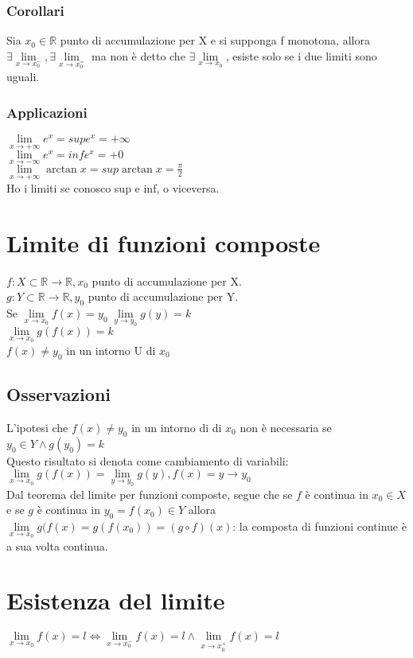\subsubsection{Corollari}
Sia $x_0\in\mathbb{R}$ punto di accumulazione per X e si supponga f monotona, allora $\exists\lim\limits_{x\rightarrow x_0^-}, \exists\lim\limits_{x\rightarrow x_0^=}$ ma non \`e detto che  $\exists\lim\limits_{x\rightarrow x_0}$, esiste solo se i due limiti sono uguali.
\subsubsection{Applicazioni}
$\lim\limits_{x\rightarrow +\infty} e^x= sup e^x=+\infty$\\
$\lim\limits_{x\rightarrow -\infty} e^x= inf e^x=+0$\\
$\lim\limits_{x\rightarrow +\infty} \arctan x= sup \arctan x=\frac{\pi}{2}$\\
Ho i limiti se conosco sup e inf, o viceversa.
\section{Limite di funzioni composte}
$f: X\subset\mathbb{R}\rightarrow\mathbb{R}, x_0$ punto di accumulazione per X.\\
$g: Y\subset\mathbb{R}\rightarrow\mathbb{R}, y_0$ punto di accumulazione per Y.\\
Se $\lim\limits_{x\rightarrow x_0} f(x)=y_0\;\lim\limits_{y\rightarrow y_0} g(y)=k$\\
$\lim\limits_{x\rightarrow x_0} g(f(x))=k$\\
$f(x)\neq y_0$ in un intorno U di $x_0$
\subsection{Osservazioni}
L'ipotesi che $f(x)\neq y_0$ in un intorno di di $x_0$ non \`e necessaria se $y_0\in Y\wedge g(y_0)=k$\\
Questo risultato si denota come cambiamento di variabili: $\lim\limits_{x\rightarrow x_0} g(f(x))=\lim\limits_{y\rightarrow y_0} g(y), f(x)=y\rightarrow y_0$\\
Dal teorema del limite per funzioni composte, segue che se $f$ \`e continua in $x_0\in X$ e se $g$ \`e continua in $y_0=f(x_0)\in Y$ allora $\lim\limits_{x\rightarrow x_0} g(f(x)=g(f(x_0))=(g\circ f)(x)$: la composta di funzioni continue \`e a sua volta continua.
\section{Esistenza del limite}
$\lim\limits_{x\rightarrow x_0}f(x)=l\Leftrightarrow\lim\limits_{x\rightarrow x_0^-}f(x)=l\wedge\lim\limits_{x\rightarrow x_0^+}f(x)=l$
